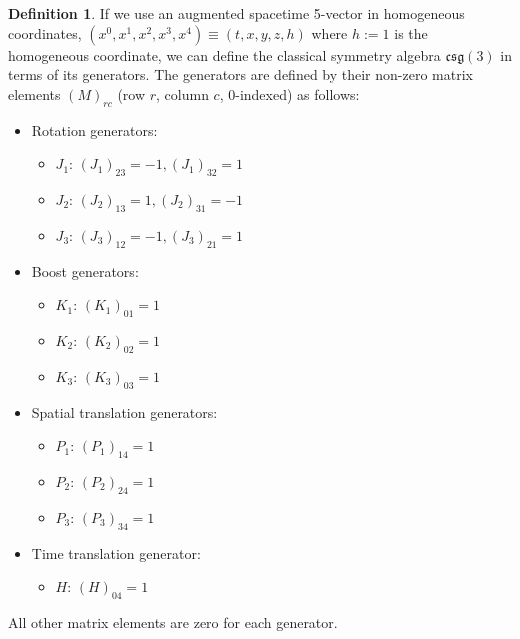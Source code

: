 \documentclass{amsart}
\theoremstyle{definition}
\newtheorem{definition}[theorem]{Definition}
\theoremstyle{remark}
\begin{document}
\begin{definition}
  If we use an augmented spacetime 5-vector in homogeneous coordinates, $(x^0, x^1, x^2, x^3, x^4) \equiv (t,x,y,z,h)$ where $h:=1$ is the homogeneous coordinate, we can define the classical symmetry algebra $\mathfrak{csg}(3)$ in terms of its generators.
  The generators are defined by their non-zero matrix elements $(M)_{rc}$ (row $r$, column $c$, 0-indexed) as follows:
    \begin{itemize}
        \item Rotation generators:
        \begin{itemize}
            \item $J_1$: $(J_1)_{23} = -1, (J_1)_{32} = 1$
            \item $J_2$: $(J_2)_{13} = 1, (J_2)_{31} = -1$
            \item $J_3$: $(J_3)_{12} = -1, (J_3)_{21} = 1$
        \end{itemize}
        \item Boost generators:
        \begin{itemize}
            \item $K_1$: $(K_1)_{01} = 1$
            \item $K_2$: $(K_2)_{02} = 1$
            \item $K_3$: $(K_3)_{03} = 1$
        \end{itemize}
        \item Spatial translation generators:
        \begin{itemize}
            \item $P_1$: $(P_1)_{14} = 1$
            \item $P_2$: $(P_2)_{24} = 1$
            \item $P_3$: $(P_3)_{34} = 1$
        \end{itemize}
        \item Time translation generator:
        \begin{itemize}
            \item $H$: $(H)_{04} = 1$
        \end{itemize}
    \end{itemize}
    All other matrix elements are zero for each generator.
\end{definition}
\end{document}

